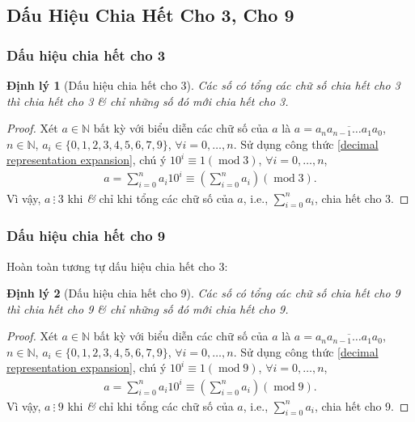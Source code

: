 \documentclass{article}
\numberwithin{equation}{section}
\newtheorem{theorem}{Định lý}[section]
\begin{document}
\subsection{Dấu Hiệu Chia Hết Cho 3, Cho 9}

\subsubsection{Dấu hiệu chia hết cho 3}

\begin{theorem}[Dấu hiệu chia hết cho 3]
	Các số có tổng các chữ số chia hết cho 3 thì chia hết cho 3 \textit{\&} chỉ những số đó mới chia hết cho 3.
\end{theorem}

\begin{proof}[Proof]
	Xét $a\in\mathbb{N}$ bất kỳ với biểu diễn các chữ số của $a$ là $a = \overline{a_na_{n-1}\ldots a_1a_0}$, $n\in\mathbb{N}$, $a_i\in\{0,1,2,3,4,5,6,7,9\}$, $\forall i = 0,\ldots,n$. Sử dụng công thức \eqref{decimal representation expansion}, chú ý $10^i\equiv 1(\operatorname{mod} 3)$, $\forall i = 0,\ldots,n$,
	\begin{align*}
		a = \sum_{i=0}^n a_i10^i\equiv\left(\sum_{i=0}^n a_i\right)(\operatorname{mod} 3).
	\end{align*}
	Vì vậy, $a\ \vdots\ 3$ khi \textit{\&} chỉ khi tổng các chữ số của $a$, i.e., $\sum_{i=0}^n a_i$, chia hết cho 3.
\end{proof}

\subsubsection{Dấu hiệu chia hết cho 9}
Hoàn toàn tương tự dấu hiệu chia hết cho 3:

\begin{theorem}[Dấu hiệu chia hết cho 9]
	Các số có tổng các chữ số chia hết cho 9 thì chia hết cho 9 \textit{\&} chỉ những số đó mới chia hết cho 9.
\end{theorem}

\begin{proof}[Proof]
	Xét $a\in\mathbb{N}$ bất kỳ với biểu diễn các chữ số của $a$ là $a = \overline{a_na_{n-1}\ldots a_1a_0}$, $n\in\mathbb{N}$, $a_i\in\{0,1,2,3,4,5,6,7,9\}$, $\forall i = 0,\ldots,n$. Sử dụng công thức \eqref{decimal representation expansion}, chú ý $10^i\equiv 1(\operatorname{mod} 9)$, $\forall i = 0,\ldots,n$,
	\begin{align*}
		a = \sum_{i=0}^n a_i10^i\equiv\left(\sum_{i=0}^n a_i\right)(\operatorname{mod} 9).
	\end{align*}
	Vì vậy, $a\ \vdots\ 9$ khi \textit{\&} chỉ khi tổng các chữ số của $a$, i.e., $\sum_{i=0}^n a_i$, chia hết cho 9.
\end{proof}
\end{document}
